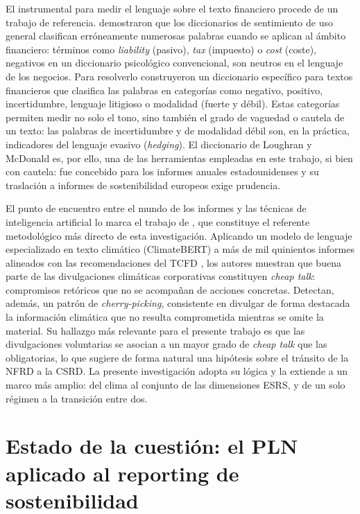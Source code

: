 El instrumental para medir el lenguaje sobre el texto financiero procede de un trabajo de referencia.
\textcite{loughran2011} demostraron que los diccionarios de sentimiento de uso
general clasifican erróneamente numerosas palabras cuando se aplican al ámbito financiero:
términos como \textit{liability} (pasivo), \textit{tax} (impuesto) o \textit{cost} (coste),
negativos en un diccionario psicológico convencional, son neutros en el lenguaje de los
negocios. Para resolverlo construyeron un diccionario específico para textos financieros que
clasifica las palabras en categorías como negativo, positivo, incertidumbre, lenguaje
litigioso o modalidad (fuerte y débil). Estas categorías permiten medir no solo el tono, sino
también el grado de vaguedad o cautela de un texto: las palabras de incertidumbre y de
modalidad débil son, en la práctica, indicadores del lenguaje evasivo (\textit{hedging}). El diccionario de Loughran y McDonald
es, por ello, una de las herramientas empleadas en este trabajo, si bien con cautela: fue concebido para los informes anuales estadounidenses y su
traslación a informes de sostenibilidad europeos exige prudencia.

El punto de encuentro entre el mundo de los informes y las técnicas de inteligencia
artificial lo marca el trabajo de \textcite{bingler2022}, que constituye el referente
metodológico más directo de esta investigación. Aplicando un modelo de lenguaje especializado
en texto climático (ClimateBERT) a más de mil quinientos informes alineados con las
recomendaciones del TCFD \parencite{tcfd2017}, los autores muestran que buena parte de las divulgaciones climáticas
corporativas constituyen \textit{cheap talk}: compromisos retóricos que no se acompañan de
acciones concretas. Detectan, además, un patrón de \textit{cherry-picking}, consistente en
divulgar de forma destacada la información climática que no resulta comprometida mientras se omite la material. Su hallazgo más relevante para el presente trabajo
es que las divulgaciones voluntarias se asocian a un mayor grado de \textit{cheap talk} que las
obligatorias, lo que sugiere de forma natural una hipótesis sobre el tránsito de la NFRD a la
CSRD. La presente investigación adopta su lógica y la extiende a un marco más amplio: del clima al conjunto de las
dimensiones ESRS, y de un solo régimen a la transición entre dos.

\section{Estado de la cuestión: el PLN aplicado al reporting de sostenibilidad}
\label{sec:estado}

